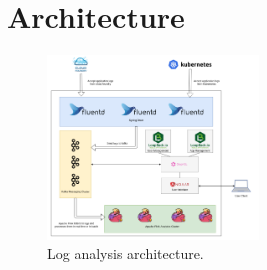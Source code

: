 \section{Architecture}

\begin{figure}[ht!]
  \centering
    \includegraphics[width=0.5\textwidth]{images/architecture.png}
  \caption{Log analysis architecture.}
\end{figure}